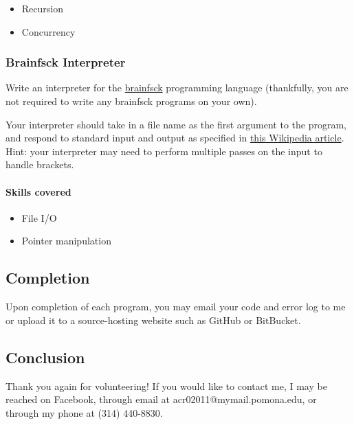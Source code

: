 \begin{itemize}
\itemsep1pt\parskip0pt
\item
  Recursion
\item
  Concurrency
\end{itemize}

\subsubsection{Brainfsck Interpreter}\label{brainfsck-interpreter}

Write an interpreter for the
\href{http://esolangs.org/wiki/Brainfuck}{brainfsck} programming
language (thankfully, you are not required to write any brainfsck
programs on your own).

Your interpreter should take in a file name as the first argument to the
program, and respond to standard input and output as specified in
\href{http://en.wikipedia.org/wiki/Brainfuck\#Commands}{this Wikipedia
article}. Hint: your interpreter may need to perform multiple passes on
the input to handle brackets.

\paragraph{Skills covered}\label{skills-covered-4}

\begin{itemize}
\itemsep1pt\parskip0pt
\item
  File I/O
\item
  Pointer manipulation
\end{itemize}

\subsection{Completion}\label{completion}

Upon completion of each program, you may email your code and error log
to me or upload it to a source-hosting website such as GitHub or
BitBucket.

\subsection{Conclusion}\label{conclusion}

Thank you again for volunteering! If you would like to contact me, I may
be reached on Facebook, through email at acr02011@mymail.pomona.edu, or
through my phone at (314) 440-8830.
